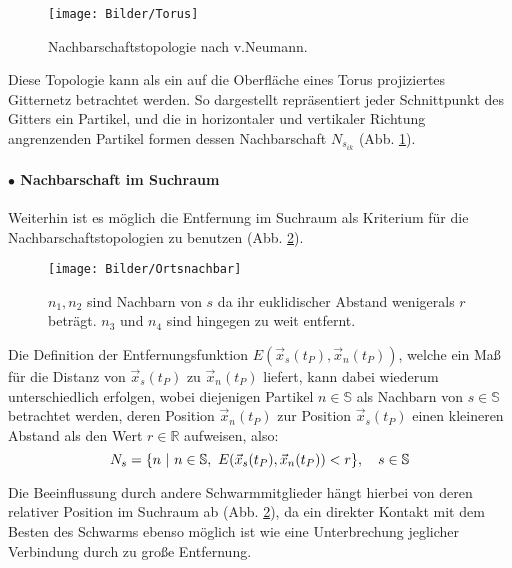   \begin{figure}[!t]
    \centering
    \texttt{[image: Bilder/Torus]}
    \caption{Nachbarschaftstopologie nach v.Neumann.}
    \label{Topologie_Torus}
  \end{figure}
  \noindent Diese Topologie kann als ein auf die Oberfläche eines Torus projiziertes Gitternetz betrachtet werden.
  So dargestellt repräsentiert jeder Schnittpunkt des Gitters ein Partikel, und die in horizontaler und vertikaler Richtung angrenzenden Partikel formen dessen Nachbarschaft $N_{s_{ik}}$ (Abb. \ref{Topologie_Torus}).

\paragraph{$\bullet$ Nachbarschaft im Suchraum}
  Weiterhin ist es möglich die Entfernung im Suchraum als Kriterium für die Nachbarschaftstopologien zu benutzen (Abb. \ref{Topologie_Ortsnachbar}).
  \begin{figure}[!b]
    \centering
    \texttt{[image: Bilder/Ortsnachbar]}
    \caption{$n_1, n_2$ sind Nachbarn von $s$ da ihr euklidischer Abstand weniger\newline als $r$ beträgt. $n_3$ und $n_4$ sind hingegen zu weit entfernt.}
    \label{Topologie_Ortsnachbar}
  \end{figure}
  
  Die Definition der Entfernungsfunktion $E(\vec{x}_s(t_P),\vec{x}_n(t_P))$, welche ein Maß für die Distanz von $\vec{x}_s(t_P)$ zu $\vec{x}_n(t_P)$ liefert, kann dabei wiederum unterschiedlich erfolgen, wobei diejenigen Partikel $n\in\mathbb{S}$ als Nachbarn von $s\in\mathbb{S}$ betrachtet werden, deren Position $\vec{x}_n(t_P)$ zur Position $\vec{x}_s(t_P)$ einen kleineren Abstand als den Wert $r\in\mathbb{R}$ aufweisen, also:
  \begin{equation}\label{DefOrtsnachbar}
      N_s = \{n \textrm{\space}\vert\textrm{\space} n\in\mathbb{S}, \textrm{\space} E(\vec{x}_s(t_P),\vec{x}_n(t_P)) < r \}, \quad s\in\mathbb{S}\\
  \end{equation}

  \noindent Die Beeinflussung durch andere Schwarmmitglieder hängt hierbei von deren relativer Position im Suchraum ab (Abb. \ref{Topologie_Ortsnachbar}), da ein direkter Kontakt mit dem Besten des Schwarms ebenso möglich ist wie eine Unterbrechung jeglicher Verbindung durch zu große Entfernung. \cite{Eberhart2001}

